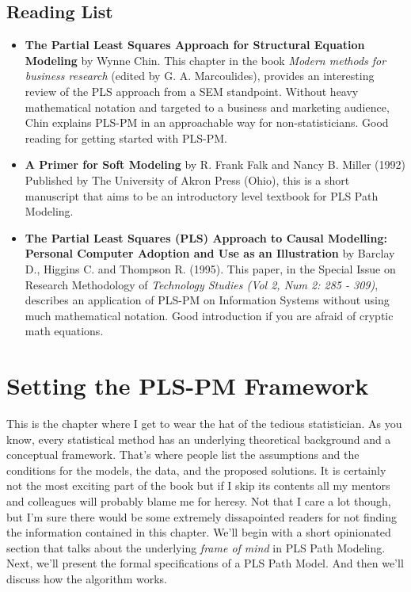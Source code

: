 \documentclass[12pt]{book}\usepackage{graphicx, color}
\begin{document}
\section{Reading List}
\begin{itemize}
 \item \textbf{\textsf{The Partial Least Squares Approach for Structural Equation Modeling}} by Wynne Chin. This chapter in the book \textit{Modern methods for business research} (edited by G. A. Marcoulides), provides an interesting review of the PLS approach from a SEM standpoint. Without heavy mathematical notation and targeted to a business and marketing audience, Chin explains PLS-PM in an approachable way for non-statisticians. Good reading for getting started with PLS-PM.
 \vspace{2mm}
 \item \textbf{\textsf{A Primer for Soft Modeling}} by R. Frank Falk and Nancy B. Miller (1992) Published by The University of Akron Press (Ohio), this is a short manuscript that aims to be an introductory level textbook for PLS Path Modeling.
\vspace{2mm}
 \item \textbf{\textsf{The Partial Least Squares (PLS) Approach to Causal Modelling: Personal Computer Adoption and Use as an Illustration}} by Barclay D., Higgins C. and Thompson R. (1995). This paper, in the Special Issue on Research Methodology of \textit{Technology Studies (Vol 2, Num 2: 285 - 309)}, describes an application of PLS-PM on Information Systems without using much mathematical notation. Good introduction if you are afraid of cryptic math equations.
\end{itemize}





\chapter{Setting the PLS-PM Framework}
This is the chapter where I get to wear the hat of the tedious statistician. As you know, every statistical method has an underlying theoretical background and a conceptual framework. That's where people list the assumptions and the conditions for the models, the data, and the proposed solutions. It is certainly not the most exciting part of the book but if I skip its contents all my mentors and colleagues will probably blame me for heresy. Not that I care a lot though, but I'm sure there would be some extremely dissapointed readers for not finding the information contained in this chapter. We'll begin with a short opinionated section that talks about the underlying \textit{frame of mind} in PLS Path Modeling. Next, we'll present the formal specifications of a PLS Path Model. And then we'll discuss how the algorithm works.
\end{document}
